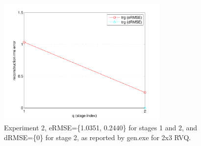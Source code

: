 							\begin{figure}[h]
							\centering
							\includegraphics[width=0.75\textwidth]{thesis2/RVQ_3x2_1_to_7_22_to_34.pdf}
							\caption{Experiment 2, eRMSE=\{1.0351, 0.2440\} for stages 1 and 2, and dRMSE=\{0\} for stage 2, as reported by gen.exe for 2x3 RVQ.}
							\label{fig:RVQ_3x2_1_to_7_22_to_34}
							\end{figure}

